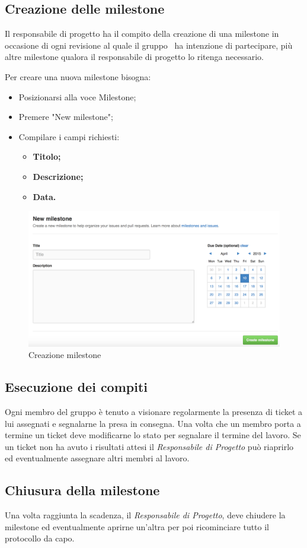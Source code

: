 \subsection{Creazione delle milestone}

Il responsabile di progetto ha il compito della creazione di una \gls{milestone} in occasione di ogni revisione al quale il gruppo \GRUPPO\ ha intenzione di partecipare, più altre \gls{milestone} qualora il responsabile di progetto lo ritenga necessario.

Per creare una nuova \gls{milestone} bisogna:

\begin{itemize}
	\item Posizionarsi alla voce \gls{Milestone};
	\item Premere "New \gls{milestone}";
	\item Compilare i campi richiesti:
		\begin{itemize}
			\item \textbf{Titolo;}
			\item \textbf{Descrizione;}
			\item \textbf{Data.}
		\end{itemize}
\end{itemize}
\begin{figure}[h]
\centering
\includegraphics[width=0.7\linewidth]{img/milestone}
\caption[Creazione milestone]{Creazione milestone}
\label{fig:milestone}
\end{figure}


\subsection{Esecuzione dei compiti}

Ogni membro del gruppo è tenuto a visionare regolarmente la presenza di \gls{ticket} a lui assegnati e segnalarne la presa in consegna.
Una volta che un membro porta a termine un \gls{ticket} deve modificarne lo stato per segnalare il termine del lavoro.
Se un \gls{ticket} non ha avuto i risultati attesi il \textit{Responsabile di Progetto} può riaprirlo ed eventualmente assegnare altri membri al lavoro.

\subsection{Chiusura della milestone}

Una volta raggiunta la scadenza, il \textit{Responsabile di Progetto}, deve chiudere la \gls{milestone} ed eventualmente aprirne un'altra per poi ricominciare tutto il protocollo da capo.

